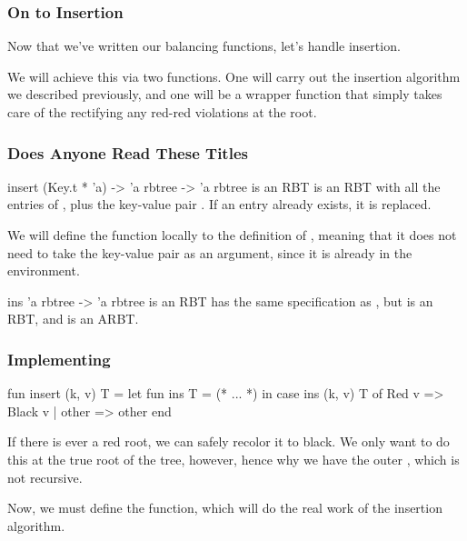 \documentclass[aspectratio=169, handout]{beamer}
\begin{document}
\begin{frame}[fragile]
  \frametitle{On to Insertion}

  Now that we've written our balancing functions, let's handle insertion.

  \pause
  \vspace{\fill}

  We will achieve this via two functions. One will carry out the
  insertion algorithm we described previously, and one will be a wrapper
  function that simply takes care of the rectifying any red-red violations
  at the root.
\end{frame}



\begin{frame}
  \frametitle{Does Anyone Read These Titles}

  \spec
    {insert}
    {(Key.t * 'a) -> 'a rbtree -> 'a rbtree}
    { is an RBT}
    { is an RBT with all the entries of ,
    plus the key-value pair . If an entry already exists,
    it is replaced.}

  \pause
  \vspace{\fill}

  We will define the  function locally to the definition of
  , meaning that it does not need to take the key-value
  pair as an argument, since it is already in the environment.

  \pause
  \vspace{\fill}

  \spec
    {ins}
    {'a rbtree -> 'a rbtree}
    { is an RBT}
    { has the same specification as , but
     is an RBT, and  is
    an ARBT.}
\end{frame}

\begin{frame}[fragile]
  \frametitle{Implementing }

  \begin{codeblock}
    fun insert (k, v) T =
      let
        fun ins T = (* ... *)
      in
        case ins (k, v) T of
          Red v => Black v
        | other => other
      end
  \end{codeblock}

  \pause
  \vspace{\fill}

  If there is ever a red root, we can safely recolor it to black. We only
  want to do this at the true root of the tree, however, hence why we have the
  outer , which is not recursive.

  \pause
  \vspace{\fill}

  Now, we must define the  function, which will do the real work of
  the insertion algorithm.
\end{frame}
\end{document}
